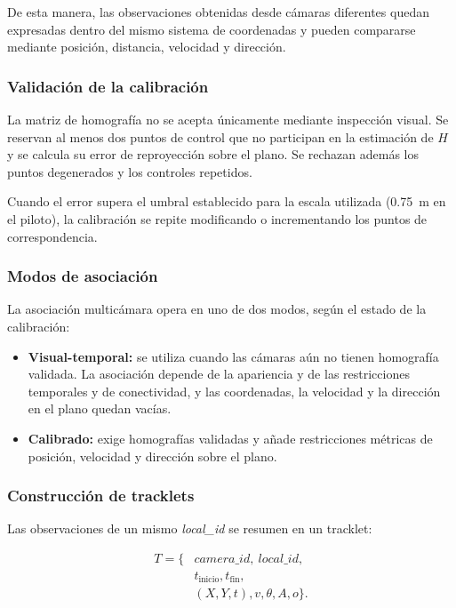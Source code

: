 \documentclass[12pt,a4paper]{article}
\begin{document}
De esta manera, las observaciones obtenidas desde cámaras diferentes
quedan expresadas dentro del mismo sistema de coordenadas y pueden
compararse mediante posición, distancia, velocidad y dirección.

\subsubsection{Validación de la calibración}

La matriz de homografía no se acepta únicamente mediante inspección
visual. Se reservan al menos dos puntos de control que no participan en
la estimación de $H$ y se calcula su error de reproyección sobre el
plano. Se rechazan además los puntos degenerados y los controles
repetidos.

Cuando el error supera el umbral establecido para la escala utilizada
(0.75~m en el piloto), la calibración se repite modificando o
incrementando los puntos de correspondencia.

\subsubsection{Modos de asociación}

La asociación multicámara opera en uno de dos modos, según el estado de
la calibración:

\begin{itemize}
    \item \textbf{Visual-temporal:} se utiliza cuando las cámaras aún no
    tienen homografía validada. La asociación depende de la apariencia y
    de las restricciones temporales y de conectividad, y las
    coordenadas, la velocidad y la dirección en el plano quedan vacías.
    \item \textbf{Calibrado:} exige homografías validadas y añade
    restricciones métricas de posición, velocidad y dirección sobre el
    plano.
\end{itemize}

\subsubsection{Construcción de tracklets}

Las observaciones de un mismo \textit{local\_id} se resumen en un
tracklet:

\begin{equation}
\begin{aligned}
T=\{&
camera\_id,\ local\_id,\\
&t_{\text{inicio}},t_{\text{fin}},\\
&(X,Y,t),v,\theta,A,o
\}.
\end{aligned}
\end{equation}
\end{document}
